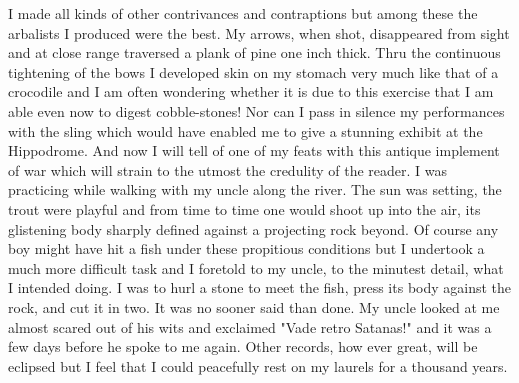 \documentclass[a4paper,12pt,english,twoside,openright]{memoir}
\begin{document}
	I made all kinds of other contrivances and contraptions but among these the arbalists I produced 
	were the best.  My arrows, when shot, disappeared from sight and at close range traversed a 
	plank of pine one inch thick.  Thru the continuous tightening of the bows I developed skin on my 
	stomach very much like that of a crocodile and I am often wondering whether it is due to this 
	exercise that I am able even now to digest cobble-stones! Nor can I pass in silence my 
	performances with the sling which would have enabled me to give a stunning exhibit at the 
	Hippodrome.  And now I will tell of one of my feats with this antique implement of war which will 
	strain to the utmost the credulity of the reader.  I was practicing while walking with my uncle along 
	the river.  The sun was setting, the trout were playful and from time to time one would shoot up 
	into the air, its glistening body sharply defined against a projecting rock beyond.  Of course any 
	boy might have hit a fish under these propitious conditions but I undertook a much more difficult 
	task and I foretold to my uncle, to the minutest detail, what I intended doing.  I was to hurl a stone 
	to meet the fish, press its body against the rock, and cut it in two.  It was no sooner said than 
	done.  My uncle looked at me almost scared out of his wits and exclaimed "Vade retro Satanas!" 
	and it was a few days before he spoke to me again.  Other records, how ever great, will be 
	eclipsed but I feel that I could peacefully rest on my laurels for a thousand years.
	


	{\centering
		\aldine\\
		\aldine\hspace{1.2em}\aldine
		\par}
	\vspace*{2cm}
	
\end{document}
